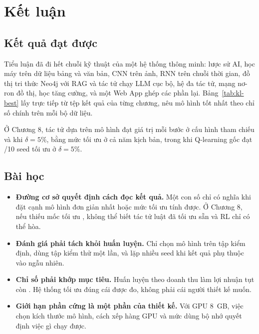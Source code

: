 \chapter*{Kết luận}

\section*{Kết quả đạt được}
Tiểu luận đã đi hết chuỗi kỹ thuật của một hệ thống thông minh: lược sử AI, học máy trên dữ liệu bảng và văn bản, CNN trên ảnh, RNN trên chuỗi thời gian, đồ thị tri thức Neo4j với RAG và tác tử
chạy LLM cục bộ, hệ đa tác tử, mạng nơ-ron đồ thị, học tăng cường, và một Web App ghép các phần lại. Bảng~\ref{tab:kl-best} lấy trực tiếp từ tệp kết quả của từng chương, nêu mô hình tốt nhất theo chỉ số chính trên mỗi bộ dữ liệu.


Ở Chương 8, tác tử dựa trên mô hình đạt giá trị  mỗi bước ở cấu hình tham chiếu và  khi $\delta=5\%$, bằng mức tối ưu ở cả năm kịch bản, trong khi Q-learning gốc đạt
/10 seed tối ưu ở $\delta=5\%$.

\section*{Bài học}
\begin{itemize}
  \item \textbf{Đường cơ sở quyết định cách đọc kết quả.} Một con số chỉ có nghĩa khi đặt cạnh mô hình đơn giản nhất hoặc mức tối ưu tính được. Ở Chương 8, nếu thiếu mốc tối ưu , không thể biết tác tử luật đã tối ưu sẵn và RL chỉ có thể hòa.
  \item \textbf{Đánh giá phải tách khỏi huấn luyện.} Chỉ chọn mô hình trên tập kiểm định, dùng tập kiểm thử một lần, và lặp nhiều seed khi kết quả phụ thuộc vào ngẫu nhiên.
  \item \textbf{Chỉ số phải khớp mục tiêu.} Huấn luyện theo doanh thu làm lợi nhuận tụt còn . Hệ thống tối ưu đúng cái được đo, không phải cái người thiết kế muốn.
  \item \textbf{Giới hạn phần cứng là một phần của thiết kế.} Với GPU 8~GB, việc chọn kích thước mô hình, cách xếp hàng GPU và mức dùng bộ nhớ quyết định việc gì chạy được.
\end{itemize}

